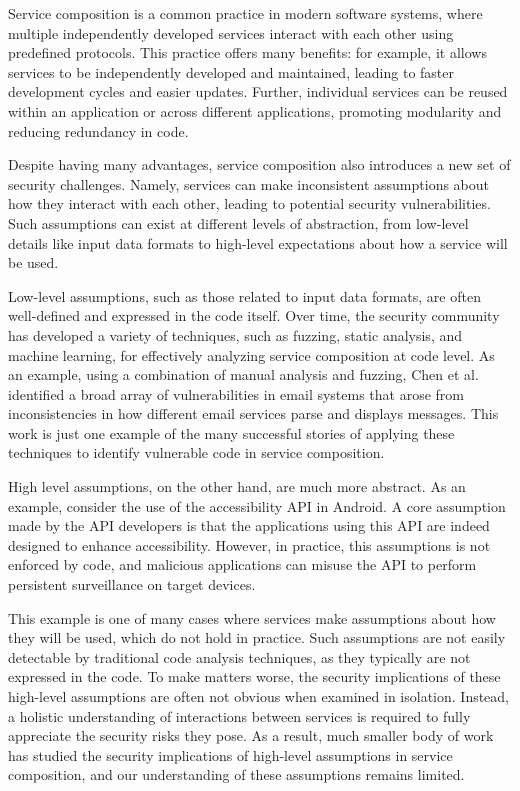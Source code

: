 \begin{dissertationintroduction}
Service composition is a common practice in modern software systems, where multiple independently developed services interact with each other using predefined protocols. This practice offers many benefits: for example, it allows services to be independently developed and maintained, leading to faster development cycles and easier updates. Further, individual services can be reused within an application or 
across different applications, promoting modularity and reducing redundancy in code.

Despite having many advantages, service composition
also introduces a new set of security challenges. Namely, services can make inconsistent assumptions about how they interact with each other, leading to potential security vulnerabilities. Such assumptions can exist at different levels of abstraction, from low-level details like input data formats to high-level expectations about how a service will be used. 

Low-level assumptions, such as those related to input data formats, are often well-defined and expressed in the code itself. Over time, the security community has developed a variety of techniques, such as fuzzing, static analysis, and machine learning, for effectively analyzing service composition at code level. As an example, using a combination of manual analysis and fuzzing, Chen et al.~\cite{chen2020composition} identified a broad array of vulnerabilities in email systems that arose from inconsistencies in how different email services parse and displays messages. This work is just one example of the many successful stories of applying these techniques to identify vulnerable code in service composition.

High level assumptions, on the other hand, are much more abstract. As an example, consider the use of the accessibility API in Android. A core assumption made by the API developers is that the applications using this API are indeed designed to enhance accessibility. However, in practice, this assumptions is not enforced by code, and malicious applications can misuse the API to perform persistent surveillance on target devices. 

This example is one of many cases where services make assumptions about how they will be used, which do not hold in practice. Such assumptions are not easily detectable by traditional code analysis techniques, as they typically are not expressed in the code. To make matters worse, the security implications of these high-level assumptions are often not obvious when examined in isolation. Instead, a holistic understanding of interactions between services is required to fully appreciate the security risks they pose. As a result, much smaller body of work has studied the security implications of high-level assumptions in service composition, and our understanding of these assumptions remains limited.



\end{dissertationintroduction}
